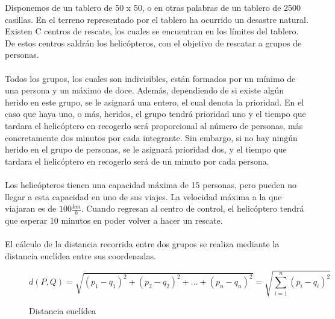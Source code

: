 Disponemos de un tablero de 50 x 50, o en otras palabras de un tablero de 2500 casillas. En el terreno representado por el tablero ha ocurrido un desastre natural. Existen C centros de rescate, los cuales se encuentran en los límites del tablero. De estos centros saldrán los helicópteros, con el objetivo de rescatar a grupos de personas.
\\ \\
Todos los grupos, los cuales son indivisibles, están formados por un mínimo de una persona y un máximo de doce. Además, dependiendo de si existe algún herido en este grupo, se le asignará una entero, el cual denota la prioridad. En el caso que haya uno, o más, heridos, el grupo tendrá prioridad uno y el tiempo que tardara el helicóptero en recogerlo será proporcional al número de personas, más concretamente dos minutos por cada integrante. Sin embargo, si no hay ningún herido en el grupo de personas, se le asignará prioridad dos, y el tiempo que tardara el helicóptero en recogerlo será de un minuto por cada persona.
\\ \\
Los helicópteros tienen una capacidad máxima de 15 personas, pero pueden no llegar a esta capacidad en uno de sus viajes. La velocidad máxima a la que viajaran es de $100 \frac{km}{h}$. Cuando regresan al centro de control, el helicóptero tendrá que esperar 10 minutos en poder volver a hacer un rescate.
\\ \\ 
El cálculo de la distancia recorrida entre dos grupos se realiza mediante la distancia euclídea entre sus coordenadas.
\begin{figure}[h]
    \label{Distancia euclídea:1}
    \[ d(P, Q)=\sqrt{(p_1-q_1)^2+(p_2-q_2)^2+...+(p_n-q_n)^2}=\sqrt{\sum_{i=1}^{n}(p_i-q_i)^2} \]
    \caption{Distancia euclídea}
\end{figure}
\newpage